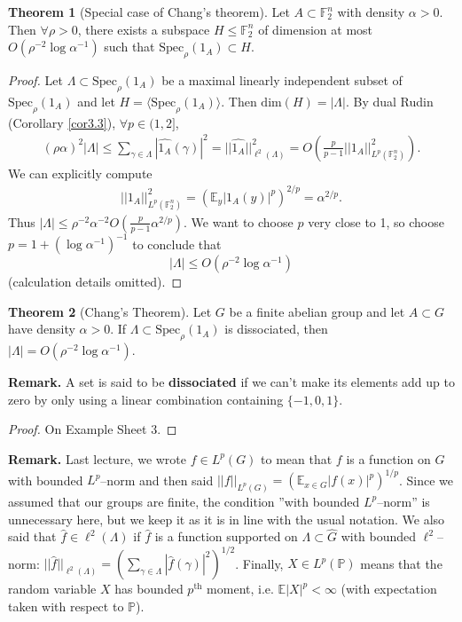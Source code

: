 \documentclass{article}
\theoremstyle{definition}
\newtheorem{theorem}{Theorem}[section]
\begin{document}
\begin{theorem}[Special case of Chang's theorem]\label{theorem3.4}
    Let $A \subset \mathbb{F}_2^n$ with density $\alpha>0$. Then $\forall \rho>0$, there exists a subspace $H \le \mathbb{F}_2^n$ of dimension at most $O \left(\rho^{-2} \log \alpha^{-1}\right)$ such that $\text{Spec}_{\rho}(1_A) \subset H$.
\end{theorem}
\begin{proof}
    Let $\Lambda \subset \text{Spec}_{\rho}(1_A)$ be a maximal linearly independent subset of $\text{Spec}_{\rho}(1_A)$ and let $H = \langle \text{Spec}_\rho (1_A)\rangle$. Then $\text{dim}(H) = \left|\Lambda\right|$. By dual Rudin (Corollary \ref{cor3.3}), $\forall p \in (1,2]$,
    \begin{align*}
        (\rho \alpha)^2 \left|\Lambda\right| \le \sum_{\gamma \in \Lambda}^{} \left|\widehat{1_A}(\gamma)\right|^2 = ||\widehat{1_A}||^2_{\ell^2(\Lambda)} = O \left( \frac{p}{p-1} ||1_A||^2_{L^p(\mathbb{F}_2^n)}\right).
    \end{align*}
    We can explicitly compute 
    \begin{align*}
        ||1_A||^2_{L^p(\mathbb{F}_2^n)} = \left(\mathbb{E}_y |1_A(y)|^p \right)^{2/p} = \alpha^{2/p}.
    \end{align*}
    Thus $\left|\Lambda\right| \le \rho^{-2}\alpha^{-2} O \left(\frac{p}{p-1} \alpha^{2/p}\right)$. We want to choose $p$ very close to 1, so choose $p = 1 + \left(\log \alpha ^{-1}\right)^{-1}$ to conclude that \[
    \left|\Lambda\right|\le O \left(\rho^{-2}\log \alpha^{-1} \right)
    \]
    (calculation details omitted).
\end{proof}
\begin{theorem}[Chang's Theorem]\label{theorem3.6}
    Let $G$ be a finite abelian group and let $A \subset G$ have density $\alpha>0$. If $\Lambda \subset \text{Spec}_{\rho}(1_A)$ is dissociated, then $\left|\Lambda\right| = O \left(\rho^{-2}\log \alpha ^{-1}\right)$.
\end{theorem}
\textbf{Remark.} A set is said to be \textbf{dissociated} if we can't make its elements add up to zero by only using a linear combination containing $\{-1,0,1\}$.
\begin{proof}
    On Example Sheet 3.
\end{proof}

\textbf{Remark.} Last lecture, we wrote $f \in L^p(G)$ to mean that $f$ is a function on $G$ with bounded $L^p$--norm and then said $||f||_{L^p(G)} = \left(\mathbb{E}_{x \in G} |f(x)|^{p}\right)^{1/p}$. Since we assumed that our groups are finite, the condition ''with bounded $L^p$--norm'' is unnecessary here, but we keep it as it is in line with the usual notation. We also said that $\widehat{f} \in \ell^2(\Lambda)$ if $\widehat{f}$ is a function supported on $\Lambda \subset \widehat{G}$ with bounded $\ell^2$--norm: $||\widehat{f}||_{\ell^2(\Lambda)} = \left(\sum_{\gamma \in \Lambda}^{} \left|\widehat{f}(\gamma)\right|^2\right)^{1/2}$. Finally, $X \in L^p(\mathbb{P})$ means that the random variable $X$ has bounded $p^{\text{th}}$ moment, i.e. $\mathbb{E}\left|X\right|^p<\infty$ (with expectation taken with respect to $\mathbb{P}$).
\vspace{1mm}
 
\end{document}
